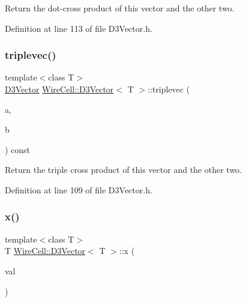 Return the dot-\/cross product of this vector and the other two. 



Definition at line 113 of file D3\+Vector.\+h.

\mbox{\label{class_wire_cell_1_1_d3_vector_ad88cac8d3f57beaddacfc20ecbc76707}} 
\subsubsection{\texorpdfstring{triplevec()}{triplevec()}}
{\footnotesize\ttfamily template$<$class T$>$ \\
\hyperlink{class_wire_cell_1_1_d3_vector}{D3\+Vector} \hyperlink{class_wire_cell_1_1_d3_vector}{Wire\+Cell\+::\+D3\+Vector}$<$ T $>$\+::triplevec (\begin{DoxyParamCaption}\item[{\hyperlink{class_wire_cell_1_1_d3_vector}{D3\+Vector}$<$ T $>$ \&}]{a,  }\item[{\hyperlink{class_wire_cell_1_1_d3_vector}{D3\+Vector}$<$ T $>$ \&}]{b }\end{DoxyParamCaption}) const\hspace{0.3cm}{\ttfamily [inline]}}



Return the triple cross product of this vector and the other two. 



Definition at line 109 of file D3\+Vector.\+h.

\mbox{\label{class_wire_cell_1_1_d3_vector_a9897c0952e82c2e7c285a4f064c00c80}} 
\subsubsection{\texorpdfstring{x()}{x()}\hspace{0.1cm}{\footnotesize\ttfamily [1/2]}}
{\footnotesize\ttfamily template$<$class T$>$ \\
T \hyperlink{class_wire_cell_1_1_d3_vector}{Wire\+Cell\+::\+D3\+Vector}$<$ T $>$\+::x (\begin{DoxyParamCaption}\item[{const T \&}]{val }\end{DoxyParamCaption})\hspace{0.3cm}{\ttfamily [inline]}}



